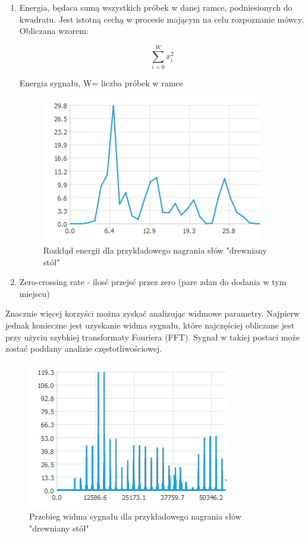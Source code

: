 \documentclass[a4paper,12 pt]{article}
\begin{document}
\begin{enumerate}
\item Energia, będaca sumą wszystkich próbek w danej ramce, podniesionych do kwadratu. Jest istotną cechą w procesie mającym na celu rozpoznanie mówcy.
\newline Obliczana wzorem:
\begin{mycapequ}[h]
\begin{equation}
\sum\limits_{i=0}^{W} x_{i}^2
\end{equation}
\caption{Energia sygnału, W= liczba próbek w ramce}
\end{mycapequ} 
\FloatBarrier

\begin{figure}[h]

\centering
\includegraphics{energia.png}
\caption{Rozkłąd energii dla przykładowego nagrania słów "drewniany stół"}

\end{figure}
\FloatBarrier

\item Zero-crossing rate - ilosć przejsć przez zero (pare zdan do dodania w tym miejscu)

\end{enumerate}

Znacznie więcej korzyści można zyskać analizując widmowe parametry. Najpierw jednak konieczne jest uzyskanie widma sygnału, które najczęściej obliczane jest przy użyciu szybkiej transformaty Fouriera (FFT). Sygnał w takiej postaci może zostać poddany analizie częstotliwościowej.
\begin{figure}[h]

\centering
\includegraphics{fft.png}
\caption{Przebieg widma sygnału dla przykładowego nagrania słów "drewniany stół"}

\end{figure}
\FloatBarrier
\end{document}
